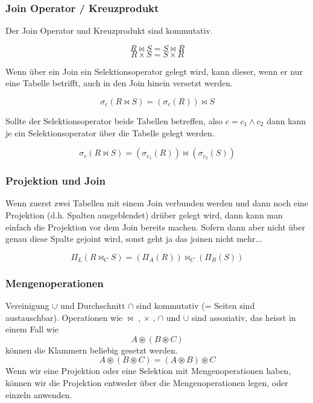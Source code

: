\subsubsection{Join Operator / Kreuzprodukt}
Der Join Operator und Kreuzprodukt sind kommutativ.

\begin{equation*}
  R \bowtie S = S \bowtie R
\end{equation*}
\begin{equation*}
  R \times S = S \times R
\end{equation*}

Wenn über ein Join ein Selektionsoperator gelegt wird, kann dieser, wenn er nur eine Tabelle betrifft, auch in den Join hinein versetzt werden.

\begin{equation}
  \sigma _c (R \bowtie S) =  (\sigma _c  (R))\bowtie S
\end{equation}

Sollte der Selektionsoperator beide Tabellen betreffen, also \(c = c_1 \wedge c_2\) dann kann je ein Selektionsoperator über die Tabelle gelegt werden.

\begin{equation}
  \sigma _c (R\bowtie S) = (\sigma _ {c_1} (R)) \bowtie (\sigma _ {c_2} (S))
\end{equation}

\subsubsection{Projektion und Join}
Wenn zuerst zwei Tabellen mit einem Join verbunden werden und dann noch eine Projektion (d.h. Spalten ausgeblendet) drüber gelegt wird, dann kann man einfach die Projektion vor dem Join bereits machen. Sofern dann aber nicht über genau diese Spalte gejoint wird, sonst geht ja das joinen nicht mehr...

\begin{equation}
  \Pi _{L} (R \bowtie _C S) = (\Pi _{A} (R)) \bowtie _C (\Pi _B (S))
\end{equation}

\subsubsection{Mengenoperationen}
Vereinigung \(\cup\) und Durchschnitt \(\cap\) sind kommutativ (= Seiten sind austauschbar). Operationen wie \(\bowtie\) , \(\times\) , \(\cap\) und \(\cup\) sind assoziativ, das heisst in einem Fall wie
\begin{equation}
  A \circledast (B \circledast C)
\end{equation}
können die Klammern beliebig gesetzt werden.
\begin{equation}
  A \circledast (B \circledast C) = (A \circledast B) \circledast C
\end{equation}
Wenn wir eine Projektion oder eine Selektion mit Mengenoperationen haben, können wir die Projektion entweder über die Mengenoperationen legen, oder einzeln anwenden.

